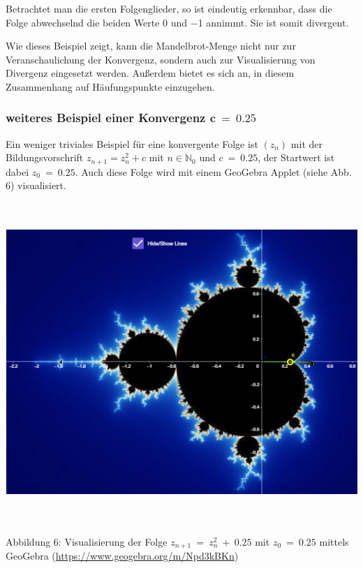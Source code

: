 \documentclass[a4paper, 12pt]{book}
\begin{document}
Betrachtet man die ersten Folgenglieder, so ist eindeutig erkennbar,
dass die Folge abwechselnd die beiden Werte 0 und \(-\)1 annimmt. Sie
ist somit divergent.

Wie dieses Beispiel zeigt, kann die Mandelbrot-Menge nicht nur zur
Veranschaulichung der Konvergenz, sondern auch zur Visualisierung von
Divergenz eingesetzt werden. Außerdem bietet es sich an, in diesem
Zusammenhang auf Häufungspunkte einzugehen.

\hypertarget{weiteres-beispiel-einer-konvergenz-mathbfc-0.25}{%
\subsubsection{\texorpdfstring{weiteres Beispiel einer Konvergenz
\(\mathbf{c\  = \ 0.25}\)}{weiteres Beispiel einer Konvergenz \textbackslash mathbf\{c\textbackslash{}  = \textbackslash{} 0.25\}}}\label{weiteres-beispiel-einer-konvergenz-mathbfc-0.25}}

Ein weniger triviales Beispiel für eine konvergente Folge ist
\(\left( z_{n} \right)\) mit der Bildungsvorschrift
\(z_{n + 1} = z_{n}^{2} + c\) mit \(n \in \mathbb{N}_{0}\) und
\(c\  = \ 0.25\), der Startwert ist dabei \(z_{0}\  = \ 0.25\). Auch
diese Folge wird mit einem GeoGebra Applet (siehe Abb. 6) visualisiert.

\includegraphics[width=6.33858in,height=4.77468in]{image11.png}

\protect\hypertarget{_Toc167901656}{}{}Abbildung 6: Visualisierung der
Folge \(z_{n + 1}\  = \ z_{n}^{2}\  + \ 0.25\) mit \(z_{0}\  = \ 0.25\)
mittels GeoGebra (\url{https://www.geogebra.org/m/Npd3kBKn})
\end{document}
